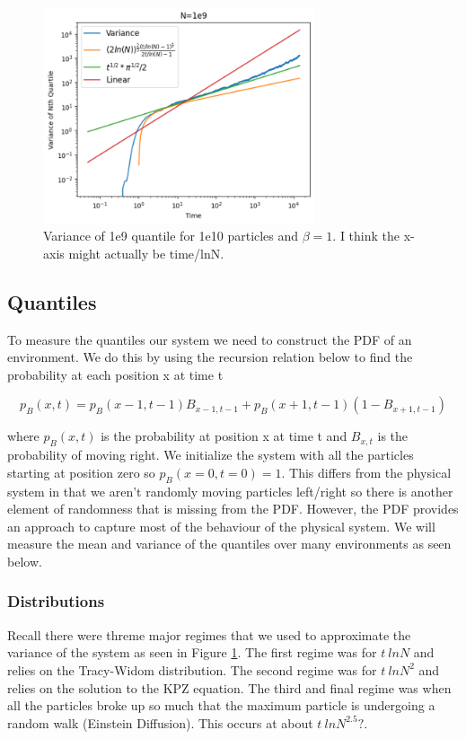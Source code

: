 \documentclass{article}
\begin{document}
\begin{figure}[H]
\centering
\includegraphics[width=8cm]{Var1e9}
\caption{Variance of 1e9 quantile for 1e10 particles and $\beta=1$. I think the x-axis might actually be time/lnN.}
\label{fig:Variance}
\end{figure}

\subsection{Quantiles}
\indent\indent To measure the quantiles our system we need to construct the PDF of an environment. We do this by using the recursion relation below to find the probability at each position x at time t

\begin{equation}
p_{B}(x, t) = p_{B}(x-1, t-1)B_{x-1, t-1} + p_{B}(x+1, t-1)(1 - B_{x+1, t-1})
\end{equation}

where $p_{B}(x,t)$ is the probability at position x at time t and $B_{x, t}$ is the probability of moving right. We initialize the system with all the particles starting at position zero so $p_{B}(x=0, t=0) = 1$. This differs from the physical system in that we aren't randomly moving particles left/right so there is another element of randomness that is missing from the PDF. However, the PDF provides an approach to capture most of the behaviour of the physical system. We will measure the mean and variance of the quantiles over many environments as seen below.

\subsubsection{Distributions}
\indent\indent Recall there were threme major regimes that we used to approximate the variance of the system as seen in Figure \ref{fig:Variance}. The first regime was for $t~lnN$ and relies on the Tracy-Widom distribution. The second regime was for $t~lnN^2$ and relies on the solution to the KPZ equation. The third and final regime was when all the particles broke up so much that the maximum particle is undergoing a random walk (Einstein Diffusion). This occurs at about $t~lnN^2.5?$.
\end{document}

